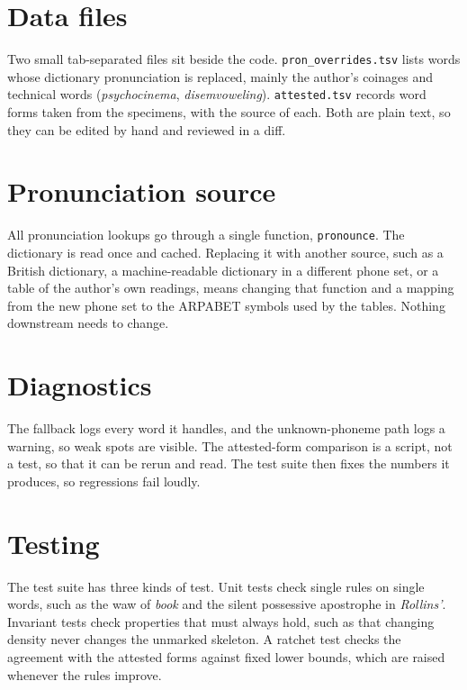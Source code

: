 \section{Data files}
Two small tab-separated files sit beside the code. \texttt{pron\_overrides.tsv} lists words whose dictionary pronunciation is replaced, mainly the author's coinages and technical words (\emph{psychocinema}, \emph{disemvoweling}). \texttt{attested.tsv} records word forms taken from the specimens, with the source of each. Both are plain text, so they can be edited by hand and reviewed in a diff.

\section{Pronunciation source}
All pronunciation lookups go through a single function, \texttt{pronounce}. The dictionary is read once and cached. Replacing it with another source, such as a British dictionary, a machine-readable dictionary in a different phone set, or a table of the author's own readings, means changing that function and a mapping from the new phone set to the ARPABET symbols used by the tables. Nothing downstream needs to change.

\section{Diagnostics}
The fallback logs every word it handles, and the unknown-phoneme path logs a warning, so weak spots are visible. The attested-form comparison is a script, not a test, so that it can be rerun and read. The test suite then fixes the numbers it produces, so regressions fail loudly.

\section{Testing}
The test suite has three kinds of test. Unit tests check single rules on single words, such as the waw of \emph{book} and the silent possessive apostrophe in \emph{Rollins'}. Invariant tests check properties that must always hold, such as that changing density never changes the unmarked skeleton. A ratchet test checks the agreement with the attested forms against fixed lower bounds, which are raised whenever the rules improve.
